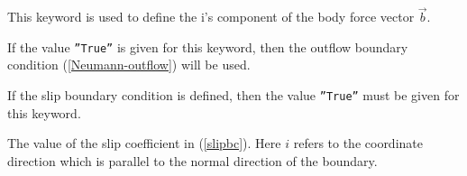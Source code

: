 \sifend
\sifend


\sifbegin
{}
\sifbegin

This keyword is used to define the i's component of the body force vector $\vec b$.

\sifend
\sifend




\sifbegin
{}
\sifbegin

If the value {\tt ''True''} is given
for this keyword, then the outflow boundary condition (\ref{Neumann-outflow}) 
will be used.

If the slip boundary condition is defined, then the value {\tt ''True''}
must be given for this keyword.

The value of the slip coefficient in (\ref{slipbc}).
Here $i$ refers to the coordinate direction which is parallel to the normal 
direction of the boundary.




\sifend
\sifend

